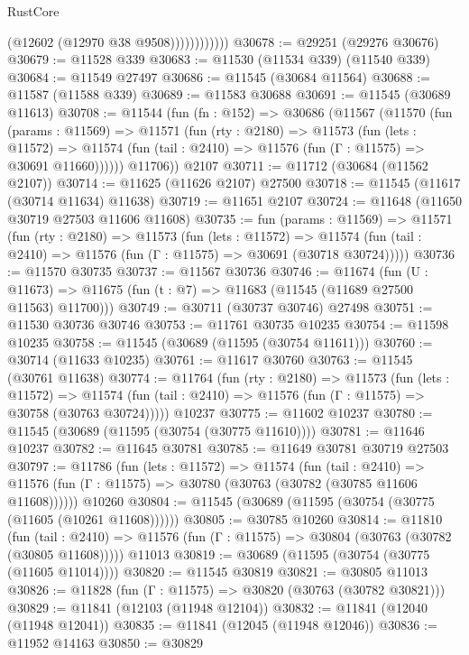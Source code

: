 \begin{lexlean}{RustCore}
\begin{coremodule}
                        (@12602 (@12970 @38 @9508))))))))))))
@30678 := @29251 (@29276 @30676)
@30679 := @11528 @339
@30683 := @11530 (@11534 @339) (@11540 @339)
@30684 := @11549 @27497
@30686 := @11545 (@30684 @11564)
@30688 := @11587 (@11588 @339)
@30689 := @11583 @30688
@30691 := @11545 (@30689 @11613)
@30708 := @11544
    (fun (fn : @152) =>
    @30686
      (@11567
        (@11570
          (fun (params : @11569) =>
          @11571
            (fun (rty : @2180) =>
            @11573
              (fun (lets : @11572) =>
              @11574 (fun (tail : @2410) => @11576 (fun (Γ : @11575) => @30691 @11660))))))
        @11706))
    @2107
@30711 := @11712 (@30684 (@11562 @2107))
@30714 := @11625 (@11626 @2107) @27500
@30718 := @11545 (@11617 (@30714 @11634) @11638)
@30719 := @11651 @2107
@30724 := @11648 (@11650 @30719 @27503 @11606 @11608)
@30735 := fun (params : @11569) =>
  @11571
    (fun (rty : @2180) =>
    @11573
      (fun (lets : @11572) =>
      @11574 (fun (tail : @2410) => @11576 (fun (Γ : @11575) => @30691 (@30718 @30724)))))
@30736 := @11570 @30735
@30737 := @11567 @30736
@30746 := @11674
    (fun (U : @11673) => @11675 (fun (t : @7) => @11683 (@11545 (@11689 @27500 @11563) @11700)))
@30749 := @30711 (@30737 @30746) @27498
@30751 := @11530 @30736 @30746
@30753 := @11761 @30735 @10235
@30754 := @11598 @10235
@30758 := @11545 (@30689 (@11595 (@30754 @11611)))
@30760 := @30714 (@11633 @10235)
@30761 := @11617 @30760
@30763 := @11545 (@30761 @11638)
@30774 := @11764
    (fun (rty : @2180) =>
    @11573
      (fun (lets : @11572) =>
      @11574 (fun (tail : @2410) => @11576 (fun (Γ : @11575) => @30758 (@30763 @30724)))))
    @10237
@30775 := @11602 @10237
@30780 := @11545 (@30689 (@11595 (@30754 (@30775 @11610))))
@30781 := @11646 @10237
@30782 := @11645 @30781
@30785 := @11649 @30781 @30719 @27503
@30797 := @11786
    (fun (lets : @11572) =>
    @11574
      (fun (tail : @2410) =>
      @11576 (fun (Γ : @11575) => @30780 (@30763 (@30782 (@30785 @11606 @11608))))))
    @10260
@30804 := @11545 (@30689 (@11595 (@30754 (@30775 (@11605 (@10261 @11608))))))
@30805 := @30785 @10260
@30814 := @11810
    (fun (tail : @2410) => @11576 (fun (Γ : @11575) => @30804 (@30763 (@30782 (@30805 @11608)))))
    @11013
@30819 := @30689 (@11595 (@30754 (@30775 (@11605 @11014))))
@30820 := @11545 @30819
@30821 := @30805 @11013
@30826 := @11828 (fun (Γ : @11575) => @30820 (@30763 (@30782 @30821)))
@30829 := @11841 (@12103 (@11948 @12104))
@30832 := @11841 (@12040 (@11948 @12041))
@30835 := @11841 (@12045 (@11948 @12046))
@30836 := @11952 @14163
@30850 := @30829

\end{coremodule}
\end{lexlean}
